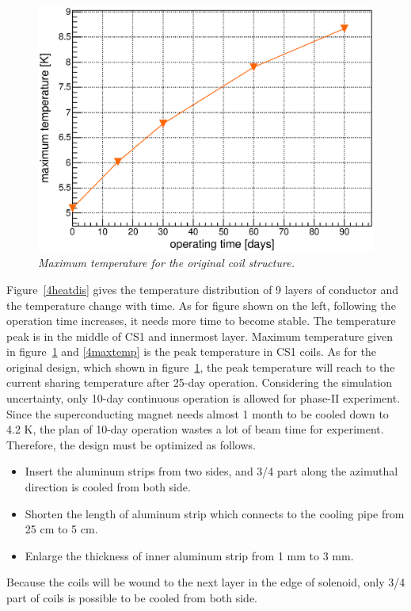 \begin{figure}[H]
 \centering
 \includegraphics[scale=0.43]{chapter5/fig/temp.eps}
 \caption{\it Maximum temperature for the original coil structure.}
 \label{origin}
\end{figure}
Figure~\ref{4heatdis} gives the temperature distribution of 9 layers of conductor and the temperature change with time.
As for figure shown on the left, following the operation time increases, it needs more time to become stable.
The temperature peak is in the middle of CS1 and innermost layer.
Maximum temperature given in figure~\ref{origin} and \ref{4maxtemp} is the peak temperature in CS1 coils.
As for the original design, which shown in figure~\ref{origin}, the peak temperature will reach to the current sharing temperature after 25-day operation.
Considering the simulation uncertainty, only 10-day continuous operation is allowed for phase-II experiment.
Since the superconducting magnet needs almost 1 month to be cooled down to 4.2 K, the plan of 10-day operation wastes a lot of beam time for experiment.
Therefore, the design must be optimized as follows.
\begin{itemize}
 \setlength{\itemsep}{-5pt}
 \item Insert the aluminum strips from two sides, and 3/4 part along the azimuthal direction is cooled from both side.
 \item Shorten the length of aluminum strip which connects to the cooling pipe from 25 cm to 5 cm.
 \item Enlarge the thickness of inner aluminum strip from 1 mm to 3 mm. 
\end{itemize}
Because the coils will be wound to the next layer in the edge of solenoid, only 3/4 part of coils is possible to be cooled from both side.
